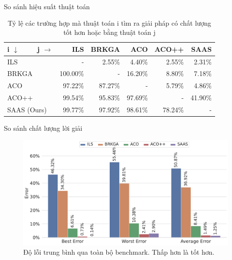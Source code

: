 \documentclass[aspectratio=169]{beamer}
\begin{document}
\begin{frame}{So sánh hiệu suất thuật toán}
    \centering
    \begin{table}
        \small
        \caption{Tỷ lệ các trường hợp mà thuật toán i tìm ra giải pháp có chất lượng tốt hơn hoặc bằng thuật toán j}
        \label{tab:winpercent}
        \begin{tabular}{l|rrrrr}
            \hline
            i $\downarrow$ \ \ \ \ j $\rightarrow$ & ILS      & BRKGA   & ACO     & ACO++   & SAAS    \\
            \hline
            ILS                                    & -        & 2.55\%  & 4.40\%  & 2.55\%  & 2.31\%  \\
            BRKGA                                  & 100.00\% & -       & 16.20\% & 8.80\%  & 7.18\%  \\
            ACO                                    & 97.22\%  & 87.27\% & -       & 5.79\%  & 4.86\%  \\
            ACO++                                  & 99.54\%  & 95.83\% & 97.69\% & -       & 41.90\% \\
            SAAS (Ours)                            & 99.77\%  & 97.92\% & 98.61\% & 78.24\% & -       \\
            \hline
        \end{tabular}
    \end{table}
\end{frame}
\begin{frame}{So sánh chất lượng lời giải}
    \begin{figure}
        \centering
        \includegraphics[width=0.75\linewidth]{img/error_rate.pdf}
        \caption{Độ lỗi trung bình qua toàn bộ benchmark. Thấp hơn là tốt hơn.}
        \label{fig:error_rate}
    \end{figure}
\end{frame}
\end{document}
